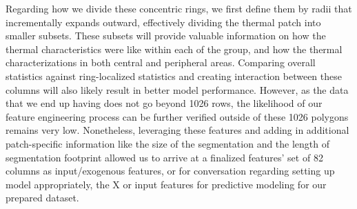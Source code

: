 \documentclass[preprint,12pt]{elsarticle}
\begin{document}
        Regarding how we divide these concentric rings, we first define them by radii that incrementally expands outward, effectively dividing the thermal patch into smaller subsets. These subsets will provide valuable information on how the thermal characteristics were like within each of the group, and how the thermal characterizations in both central and peripheral areas. Comparing overall statistics against ring-localized statistics and creating interaction between these columns will also likely result in better model performance. However, as the data that we end up having does not go beyond 1026 rows, the likelihood of our feature engineering process can be further verified outside of these 1026 polygons remains very low. Nonetheless, leveraging these features and adding in additional patch-specific information like the size of the segmentation and the length of segmentation footprint allowed us to arrive at a finalized features' set of 82 columns as input/exogenous features, or for conversation regarding setting up model appropriately, the X or input features for predictive modeling for our prepared dataset. 
        
        
        
\end{document}
